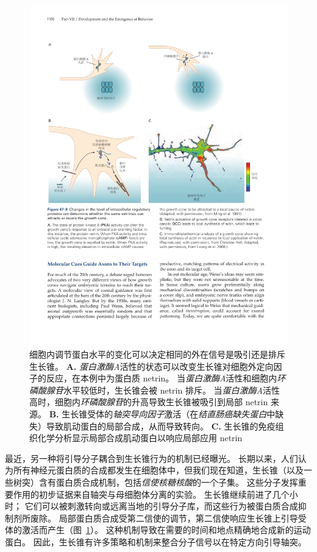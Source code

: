 \begin{figure}[htbp]
	\centering
	\includegraphics[width=1.0\linewidth]{chap47/fig_47_8}
	\caption{细胞内调节蛋白水平的变化可以决定相同的外在信号是吸引还是排斥生长锥。
		\textbf{A.} \textit{蛋白激酶A}活性的状态可以改变生长锥对细胞外定向因子的反应，在本例中为蛋白质 netrin。
		当\textit{蛋白激酶A}活性和细胞内\textit{环磷酸腺苷}水平较低时，生长锥会被 netrin 排斥。
		当\textit{蛋白激酶A}活性高时，细胞内\textit{环磷酸腺苷}的升高导致生长锥被吸引到局部 netrin 来源\cite{ming1997camp}。
		\textbf{B.} 生长锥受体的\textit{轴突导向因子}激活（在\textit{结直肠癌缺失蛋白}中缺失）导致肌动蛋白的局部合成，从而导致转向。
		\textbf{C.} 生长锥的免疫组织化学分析显示局部合成肌动蛋白以响应局部应用 netrin\cite{leung2006asymmetrical} }
	\label{fig:47_8}
\end{figure}


最近，另一种将引导分子耦合到生长锥行为的机制已经曝光。
长期以来，人们认为所有神经元蛋白质的合成都发生在细胞体中，但我们现在知道，生长锥（以及一些树突）含有蛋白质合成机制，包括\textit{信使核糖核酸}的一个子集。
这些分子发挥重要作用的初步证据来自轴突与母细胞体分离的实验。
生长锥继续前进了几个小时； 它们可以被刺激转向或远离当地的引导分子库，而这些行为被蛋白质合成抑制剂所废除。
局部蛋白质合成受第二信使的调节，第二信使响应生长锥上引导受体的激活而产生（图~\ref{fig:47_8}）。
这种机制导致在需要的时间和地点精确地合成新的运动蛋白。
因此，生长锥有许多策略和机制来整合分子信号以在特定方向引导轴突。



